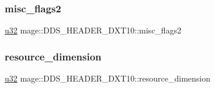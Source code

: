 \subsubsection{\texorpdfstring{misc\+\_\+flags2}{misc\_flags2}}
{\footnotesize\ttfamily \hyperlink{namespacemage_af2b398bf98eb10351f49cad73fe2cc73}{u32} mage\+::\+D\+D\+S\+\_\+\+H\+E\+A\+D\+E\+R\+\_\+\+D\+X\+T10\+::misc\+\_\+flags2}

\hypertarget{structmage_1_1_d_d_s___h_e_a_d_e_r___d_x_t10_ab03495914b5c6b94cba4c46e54407536}{}\label{structmage_1_1_d_d_s___h_e_a_d_e_r___d_x_t10_ab03495914b5c6b94cba4c46e54407536} 
\subsubsection{\texorpdfstring{resource\+\_\+dimension}{resource\_dimension}}
{\footnotesize\ttfamily \hyperlink{namespacemage_af2b398bf98eb10351f49cad73fe2cc73}{u32} mage\+::\+D\+D\+S\+\_\+\+H\+E\+A\+D\+E\+R\+\_\+\+D\+X\+T10\+::resource\+\_\+dimension}

